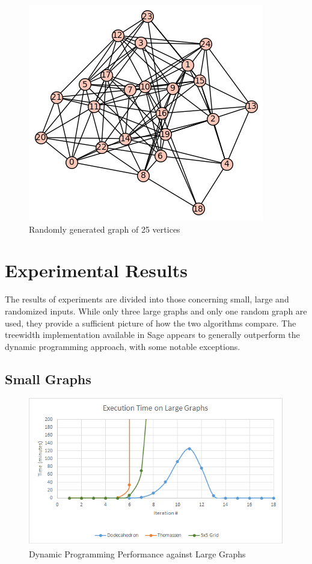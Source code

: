 \documentclass[12pt,conference]{IEEEtran}
\theoremstyle{plain}
\begin{document}
\begin{figure}
\caption{Randomly generated graph of 25 vertices}
\centering
\includegraphics[scale=0.75]{random-25}
\end{figure}

\section{Experimental Results}

The results of experiments are divided into those concerning small, large and randomized inputs. While only three large graphs and only one random graph are used, they provide a sufficient picture of how the two algorithms compare. The treewidth implementation available in Sage appears to generally outperform the dynamic programming approach, with some notable exceptions.

\subsection{Small Graphs}

\begin{figure}[!bp]
\centering
\includegraphics[scale=1.0]{large-graph-metrics}
\caption{Dynamic Programming Performance against Large Graphs}
\end{figure}
\end{document}
